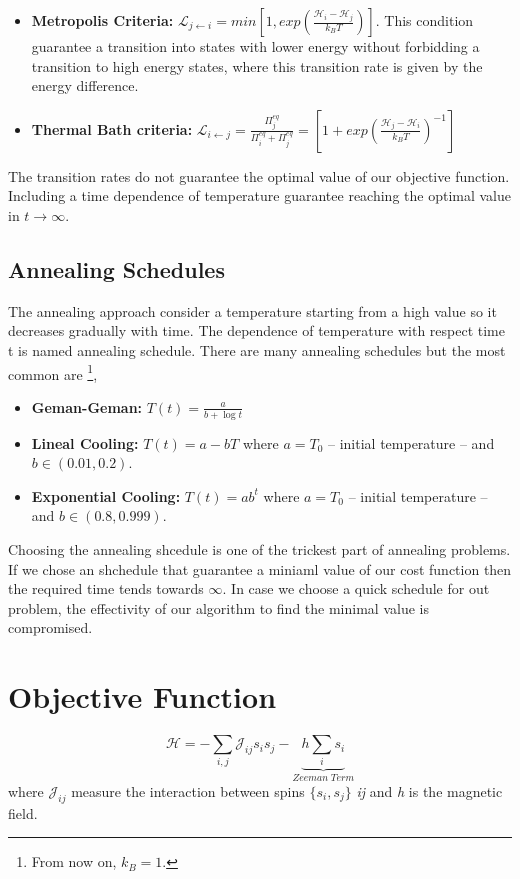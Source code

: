 \begin{itemize}
    \item\textbf{ Metropolis Criteria:} $\mathcal{L}_{j \leftarrow i} = min \left[1,exp\left(\frac{\mathcal{H}_{i}-\mathcal{H}_{j}}{k_{B}T}\right)\right]$. This condition guarantee a transition into states with lower energy without forbidding a transition to high energy states, where this transition rate is given by the energy difference. 
    \item \textbf{Thermal Bath criteria:} $\mathcal{L}_{i \leftarrow j} = \frac{\Pi_{j}^{eq}}{\Pi_{i}^{eq} + \Pi_{j}^{eq}} = \left[1 + exp\left(\frac{\mathcal{H}_{j}- \mathcal{H}_{i}}{k_{B}T}\right)^{-1}\right]$ 
\end{itemize}
 The transition rates do not guarantee the optimal value of our objective function. Including a time dependence of temperature guarantee reaching the optimal value in $t \rightarrow \infty$. 
\subsection{Annealing Schedules}
The annealing approach consider a temperature starting from a high value so it decreases gradually with time. The dependence of temperature with respect time t is named annealing schedule. There are many annealing schedules but the most common are \footnote{From now on, $k_{B} = 1$.},
\begin{itemize}
    \item \textbf{Geman-Geman:} $T(t) = \frac{a}{b + \log{t}}$
    \item \textbf{Lineal Cooling:} $T(t) = a - bT$ where $a = T_{0}$ -- initial temperature -- and $b \in (0.01,0.2)$.
    \item \textbf{Exponential Cooling:} $T(t) = ab^{t}$ where $a = T_{0}$ -- initial temperature -- and $b \in (0.8,0.999)$.
\end{itemize}
Choosing the annealing shcedule is one of the trickest part of annealing problems. If we chose an shchedule that guarantee a miniaml value of our cost function then the required time tends towards $\infty$. In case we choose a quick schedule for out problem, the effectivity of our algorithm to find the minimal value is compromised.
\section{Objective Function}
\begin{equation}
    \label{eq: SA_ObjectiveFunction}
    \mathcal{H} = -\sum_{i,j} \mathcal{J}_{ij}s_{i}s_{j} - \underbrace{h\sum_{i}s_{i}}_{Zeeman\;Term}
\end{equation}
where $\mathcal{J}_{ij}$ measure the interaction between spins $\{s_{i},s_{j}\}$ \textit{ij} and \textit{h} is the magnetic field.